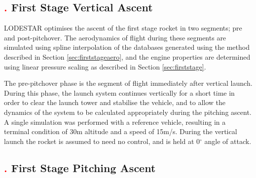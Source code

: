 \subsection{\textcolor{red}{.} First Stage Vertical Ascent}

LODESTAR optimises the ascent of the first stage rocket in two segments; pre and post-pitchover.
 The aerodynamics of flight during these segments are simulated using spline interpolation of the databases generated using the method described in Section \ref{sec:firststageaero}, and the engine properties are determined using linear pressure scaling as described in Section \ref{sec:firststage}. 
  
 The pre-pitchover phase is the segment of flight immediately after vertical launch. During this phase, the launch system continues vertically for a short time in order to clear the launch tower and stabilise the vehicle, and to allow the dynamics of the system to be calculated appropriately during the pitching ascent. A single simulation was performed with a reference vehicle, resulting in a terminal condition of 30m altitude and a speed of 15m/s.
During the vertical launch the rocket is assumed to need no control, and is held at 0$^\circ$ angle of attack. 

\subsection{\textcolor{red}{.} First Stage Pitching Ascent}

